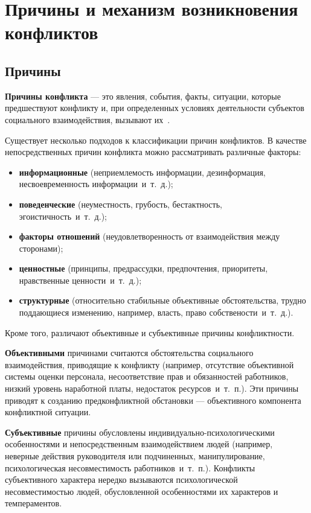 \chapter{Причины и механизм возникновения конфликтов}

\section{Причины}

\textbf{Причины конфликта} — это явления, события, факты, ситуации, которые
предшествуют конфликту и, при определенных условиях деятельности субъектов
социального взаимодействия, вызывают их~\cite{book04}.

Существует несколько подходов к классификации причин конфликтов. В
качестве непосредственных причин конфликта можно рассматривать различные
факторы:

\begin{itemize}
    \item \textbf{информационные} (неприемлемость информации, дезинформация,
        несвоевременность информации~и~т.~д.);
    \item \textbf{поведенческие} (неуместность, грубость, бестактность,
        эгоистичность~и~т.~д.);
    \item \textbf{факторы отношений} (неудовлетворенность от
        взаимодействия между сторонами);
    \item \textbf{ценностные} (принципы, предрассудки, предпочтения,
        приоритеты, нравственные ценности~и~т.~д.);
    \item \textbf{структурные} (относительно стабильные объективные
        обстоятельства, трудно поддающиеся изменению, например, власть, право
        собствености~и~т.~д.).
\end{itemize}

Кроме того, различают объективные и субъективные причины конфликтности.

\textbf{Объективными} причинами считаются обстоятельства социального взаимодействия,
приводящие к конфликту (например, отсутствие объективной системы оценки
персонала, несоответствие прав и обязанностей работников, низкий уровень
наработной платы, недостаток ресурсов~и~т.~п.). Эти причины приводят к созданию
предконфликтной обстановки --- объективного компонента конфликтной ситуации.

\textbf{Субъективные} причины обусловлены индивидуально-психологическими
особенностями и непосредственным взаимодействием людей (например, неверные
действия руководителя или подчиненных, манипулирование, психологическая
несовместимость работников~и~т.~п.). Конфликты субъективного характера нередко
вызываются психологической несовместимостью людей, обусловленной особенностями
их характеров и темпераментов.

